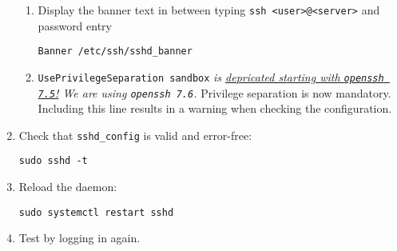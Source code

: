 \begin{enumerate}
\begin{enumerate}
	\item Display the banner text in between typing \texttt{ssh <user>@<server>} and password entry

		\texttt{Banner /etc/ssh/sshd\_banner}

	\item \texttt{UsePrivilegeSeparation sandbox} \emph{is \href{https://www.openssh.com/txt/release-7.5}{depricated starting with \emph{\texttt{openssh 7.5}}!} We are using \emph{\texttt{openssh 7.6}}.} Privilege separation is now mandatory. Including this line results in a warning when checking the configuration.

	\end{enumerate}

\item Check that \texttt{sshd\_config} is valid and error-free:

	\texttt{sudo sshd -t}

\item Reload the daemon: 

	\texttt{sudo systemctl restart sshd}

\item Test by logging in again.

\end{enumerate}

